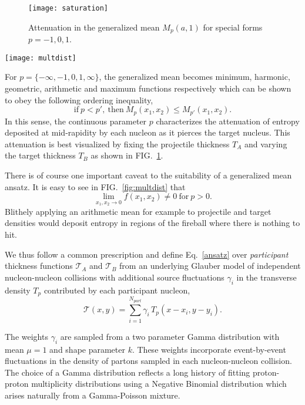 \documentclass[aps,prl,reprint,amsmath,nofootinbib]{revtex4-1}
\begin{document}
\begin{figure}[b]
  \texttt{[image: saturation]}
  \caption{\label{saturation}Attenuation in the generalized mean $M_p(a, 1)$ for special forms $p=-1, 0, 1$.}
\end{figure}

\begin{figure*}[t]
  \texttt{[image: multdist]}
  \caption{\label{fig:multdist}Minimum bias pp, pPb and PbPb charged particle distributions for power $p=0$,
  fluctuation parameter $k=0.8$ and normalization factor $\kappa'_n$ indicated in the legend.}
\end{figure*}

For $p = \{-\infty,-1,0,1,\infty\}$, the generalized mean becomes minimum, harmonic, geometric, arithmetic and
maximum functions respectively which can be shown to obey the following ordering inequality,
\begin{equation}
  \mathrm{if} ~ p<p', ~ \mathrm{then} ~ M_{p}(x_1,x_2) \le M_{p'}(x_1,x_2).
\end{equation}
In this sense, the continuous parameter $p$ characterizes the attenuation of entropy deposited at
mid-rapidity by each nucleon as it pierces the target nucleus. This attenuation is best visualized by fixing
the projectile thickness $T_A$ and varying the target thickness $T_B$ as shown in FIG.~\ref{saturation}.

There is of course one important caveat to the suitability of a generalized mean ansatz. It is easy to see in
FIG.~\ref{fig:multdist} that
\begin{equation}
  \lim\limits_{x_1,x_2 \to 0} f(x_1,x_2) \ne 0 ~\mathrm{for} ~ p>0.
\end{equation}
Blithely applying an arithmetic mean for example to projectile and target densities would deposit entropy in
regions of the fireball where there is nothing to hit.

We thus follow a common prescription and define Eq.~\eqref{ansatz} over \emph{participant} thickness
functions $\mathcal{T}_A$ and $\mathcal{T}_B$ from an underlying Glauber model of independent nucleon-nucleon
collisions with additional source fluctuations $\gamma_i$ in the transverse density $T_p$ contributed by each
participant nucleon,
\begin{equation}
  \label{thickness def}
  \mathcal{T}(x,y) = \sum\limits_{i=1}^{N_{part}} \gamma_i\, T_p(x-x_i,y-y_i).
\end{equation}

The weights $\gamma_i$ are sampled from a two parameter Gamma distribution with mean $\mu=1$ and shape
parameter $k$. These weights incorporate event-by-event fluctuations in the density of partons sampled in each
nucleon-nucleon collision. The choice of a Gamma distribution reflects a long history of fitting proton-proton
multiplicity distributions using a Negative Binomial distribution which arises naturally from a Gamma-Poisson
mixture.
\end{document}
